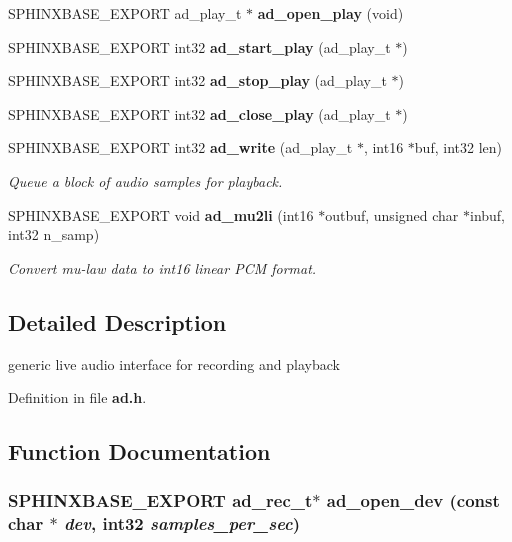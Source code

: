 \begin{CompactItemize}
\item 
SPHINXBASE\_\-EXPORT ad\_\-play\_\-t $\ast$ \textbf{ad\_\-open\_\-play} (void)\label{ad_8h_859bfe925f634f6bb3faa1a52c013388}

\item 
SPHINXBASE\_\-EXPORT int32 \textbf{ad\_\-start\_\-play} (ad\_\-play\_\-t $\ast$)\label{ad_8h_899e10aaecde4ab33b9849ed7bb9fb73}

\item 
SPHINXBASE\_\-EXPORT int32 \textbf{ad\_\-stop\_\-play} (ad\_\-play\_\-t $\ast$)\label{ad_8h_823c2efb2892ff2c9b112ffcda58ce17}

\item 
SPHINXBASE\_\-EXPORT int32 \textbf{ad\_\-close\_\-play} (ad\_\-play\_\-t $\ast$)\label{ad_8h_a65454c205e3f573f4f3433a6a044448}

\item 
SPHINXBASE\_\-EXPORT int32 {\bf ad\_\-write} (ad\_\-play\_\-t $\ast$, int16 $\ast$buf, int32 len)
\begin{CompactList}\small\item\em Queue a block of audio samples for playback. \item\end{CompactList}\item 
SPHINXBASE\_\-EXPORT void {\bf ad\_\-mu2li} (int16 $\ast$outbuf, unsigned char $\ast$inbuf, int32 n\_\-samp)\label{ad_8h_7eab4d2f35d221c569b85d4240b83600}

\begin{CompactList}\small\item\em Convert mu-law data to int16 linear PCM format. \item\end{CompactList}\end{CompactItemize}


\subsection{Detailed Description}
generic live audio interface for recording and playback 



Definition in file {\bf ad.h}.

\subsection{Function Documentation}
\subsubsection[{ad\_\-open\_\-dev}]{\setlength{\rightskip}{0pt plus 5cm}SPHINXBASE\_\-EXPORT ad\_\-rec\_\-t$\ast$ ad\_\-open\_\-dev (const char $\ast$ {\em dev}, \/  int32 {\em samples\_\-per\_\-sec})}\label{ad_8h_43f66257a2457d6c711dc5c694bfc02f}



